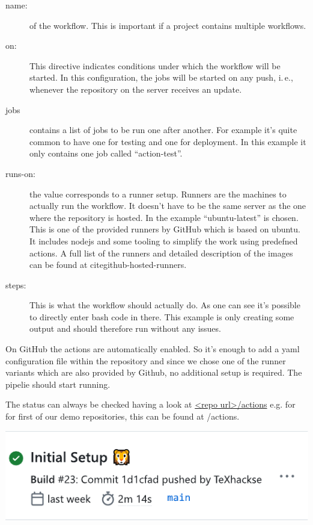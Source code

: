 \documentclass[final]{ltugboat}
\begin{document}
\begin{description}
\item[name:] of the workflow.
This is important if a project contains multiple workflows.

\item[on:] This directive indicates conditions under which the workflow will be started.
In this configuration, the jobs will be started on any push, i.\,e., whenever the repository on the server receives an update.

\item[jobs] contains a list of jobs to be run one after another.
For example it's quite common to have one for testing and one for deployment.
In this example it only contains one job called \enquote{action-test}.

\item[runs-on:] the value corresponds to a runner setup.
Runners are the machines to actually run the workflow.
It doesn't have to be the same server as the one where the repository is hosted.
In the example \enquote{ubuntu-latest} is chosen.
This is one of the provided runners by GitHub which is based on ubuntu.
It includes nodejs and some tooling to simplify the work using predefned actions.
A full list of the runners and detailed description of the images can be found at cite{github-hosted-runners}.

\item[steps:] This is what the workflow should actually do.
As one can see it's possible to directly enter bash code in there.
This example is only creating some output and should therefore run without any issues.
\end{description}

On GitHub the actions are automatically enabled.
So it's enough to add a yaml configuration file within the repository and since we chose one of the runner variants which are also provided by Github, no additional setup is required.
The pipelie should start running.

The status can always be checked having a look at
\url*{<repo url>/actions} e.g. for for first of our demo repositories, this can be found at
/actions.%

\noindent\includegraphics[width=\linewidth]{screenshot-pipeline-successful}
\end{document}
